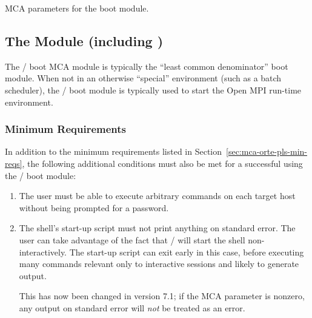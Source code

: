 \begin{table}[htbp]
  \begin{ssiparamtb}
%
  \end{ssiparamtb}
  \caption{MCA parameters for the  boot module.}
  \label{tbl:mca-orte-pls-globus-mca-params}
\end{table}


\subsection{The  Module (including )}

The / boot MCA module is typically the ``least
common denominator'' boot module.  When not in an otherwise
``special'' environment (such as a batch scheduler), the
/ boot module is typically used to start the Open MPI
run-time environment.


\subsubsection{Minimum Requirements}

In addition to the minimum requirements listed in
Section~\ref{sec:mca-orte-pls-min-reqs}, the following additional
conditions must also be met for a successful  using the
 /  boot module:

\begin{enumerate}
\item The user must be able to execute arbitrary commands on each
  target host without being prompted for a password.
  
\item The shell's start-up script must not print anything on standard
  error. The user can take advantage of the fact that  /
   will start the shell non-interactively. The start-up
  script can exit early in this case, before executing many commands
  relevant only to interactive sessions and likely to generate output.

  This has now been changed in version 7.1; if the MCA parameter
   is nonzero, any output
  on standard error will {\em not} be treated as an error.
\end{enumerate}

